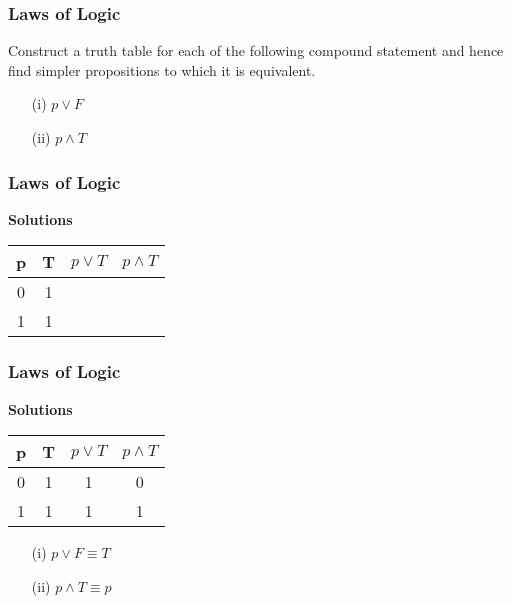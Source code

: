 \documentclass{beamer}
\begin{document}
\begin{frame}

\frametitle{Laws of Logic}
\Large
\vspace{-1cm}
Construct a truth table for each of the following compound statement and hence find simpler propositions to which it is equivalent.


\begin{itemize}
\item[(i)] $p \vee F$
\item[(ii)] $p \wedge T$
\end{itemize}
\end{frame}
\begin{frame}
\frametitle{Laws of Logic}
\Large
\vspace{-1cm}
\textbf{Solutions}
\begin{center}

\begin{tabular}{|c|c||c||c|}
\hline  \phantom{sp}p\phantom{sp}&  \phantom{sp}T\phantom{sp}& $p \vee T$ & $ p \wedge T$ \\ \hline
\hline  0 & 1 &  &  \\ 
\hline  1 &  1 &  &  \\ 
\hline 
\end{tabular} 
\end{center}
\end{frame}

\begin{frame}
\frametitle{Laws of Logic}
\Large
\vspace{-1cm}
\textbf{Solutions}
\begin{center}

\begin{tabular}{|c|c||c||c|}
\hline  \phantom{sp}p\phantom{sp}&  \phantom{sp}T\phantom{sp}& $p \vee T$ & $ p \wedge T$ \\ \hline
\hline  0 & 1 & 1 & 0 \\ 
\hline  1 &  1 & 1 & 1 \\ 
\hline 
\end{tabular} 
\end{center}
\begin{itemize}
\item[(i)] $p \vee F \equiv T$
\item[(ii)] $p \wedge T \equiv p$
\end{itemize}
\end{frame}
\end{document}
